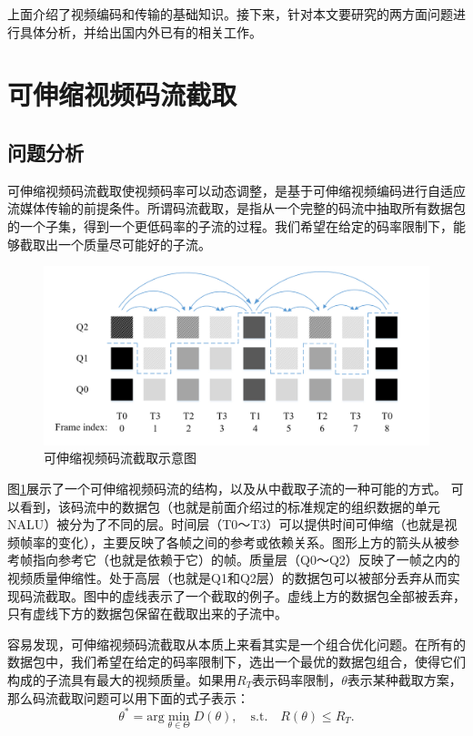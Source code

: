上面介绍了视频编码和传输的基础知识。接下来，针对本文要研究的两方面问题进行具体分析，并给出国内外已有的相关工作。

\section{可伸缩视频码流截取}

\subsection{问题分析}

可伸缩视频码流截取使视频码率可以动态调整，是基于可伸缩视频编码进行自适应流媒体传输的前提条件。所谓码流截取，是指从一个完整的码流中抽取所有数据包的一个子集，得到一个更低码率的子流的过程。我们希望在给定的码率限制下，能够截取出一个质量尽可能好的子流。

\begin{figure}[h]
	\centering
	\includegraphics[width = 1.0\linewidth]{./figures/Bitstream-Extraction.jpg}
	\caption{可伸缩视频码流截取示意图\label{fig:Bitstream-Extraction}}
\end{figure}

图\ref{fig:Bitstream-Extraction}展示了一个可伸缩视频码流的结构，以及从中截取子流的一种可能的方式。
可以看到，该码流中的数据包（也就是前面介绍过的标准规定的组织数据的单元NALU）被分为了不同的层。时间层（T0～T3）可以提供时间可伸缩（也就是视频帧率的变化），主要反映了各帧之间的参考或依赖关系。图形上方的箭头从被参考帧指向参考它（也就是依赖于它）的帧。质量层（Q0～Q2）反映了一帧之内的视频质量伸缩性。处于高层（也就是Q1和Q2层）的数据包可以被部分丢弃从而实现码流截取。图中的虚线表示了一个截取的例子。虚线上方的数据包全部被丢弃，只有虚线下方的数据包保留在截取出来的子流中。

容易发现，可伸缩视频码流截取从本质上来看其实是一个组合优化问题。在所有的数据包中，我们希望在给定的码率限制下，选出一个最优的数据包组合，使得它们构成的子流具有最大的视频质量。如果用$R_T$表示码率限制，$\theta$表示某种截取方案，那么码流截取问题可以用下面的式子表示：
\begin{equation}
{\theta}^* = \mathrm{arg} \min \limits_{\theta \in \Theta} D(\theta), \quad  \mathrm{s.t. } \quad R(\theta) \le R_T.
\end{equation}

